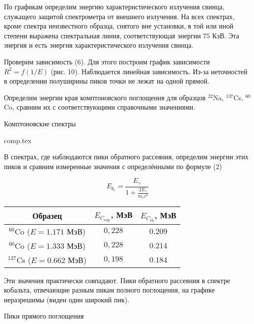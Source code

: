 По графикам определим энергию характеристического излучения свинца, служащего
защитой спектрометра от внешнего излучения. На всех спектрах, кроме спектра
неизвестного образца, снятого вне установки, в той или иной степени выражена
спектральная линия, соответствующая энергии $75$ КэВ. Эта энергия и есть энергия
характеристического излучения свинца.

Проверим зависимость (6). Для этого построим график зависимости $R^2 = f(1/E)$
(рис. 10). Наблюдается линейная зависимость. Из-за неточностей в определении
полуширины пиков точки не лежат на одной прямой.

Определим энергии края комптоновского поглощения для образцов $^{22}$Na,
$^{137}$Cs, $^{60}$Co, сравним их с соответствующими справочными значениями.

\begin{table}
\begin{center}
  \caption{Комптоновские спектры}
  {comp.tex}
\end{center}
\end{table}

В спектрах, где наблюдаются пики обратного рассеяния, определим энергии этих
пиков и сравним измеренные значения с определёнными по формуле (2)

\begin{equation}
  E_{b_s} = \frac{E_{\gamma}}{1 + \frac{2E_{\gamma}}{m_e c^2}}
\end{equation}

\begin{table}
  \begin{center}
  \begin{tabular}{| c | c | c |}
  \hline
  Образец & $E_{C_{\text{exp}}}$, МэВ & $E_{C_{\text{th}}}$, МэВ \\
  \hline
  ${}^{60}$Co ($E = 1.171$ МэВ) & $0,228$ & $0.209$ \\
  \hline
  ${}^{60}$Co ($E = 1.333$ МэВ) & $0,228$ & $0.214$ \\
  \hline
  ${}^{137}$Cs ($E = 0.662$ МэВ) & $0,198$ & $0.184$ \\
  \hline
\end{tabular}
\end{center}
\end{table}

Эти значения практически совпадают. Пики обратного рассеяния в спектре кобальта,
отвечающие разным пикам полного поглощения, на графике неразрешимы (виден один
широкий пик).

\begin{table}[h!]
  \centering
  \caption{Пики прямого поглощения}
  
\end{table}
